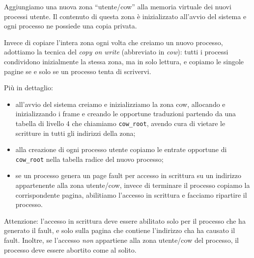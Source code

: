 Aggiungiamo una nuova zona ``utente/cow'' alla memoria virtuale dei nuovi processi utente.
Il contenuto di questa zona \`e inizializzato all'avvio del sistema e ogni processo ne possiede
una copia privata.

Invece di copiare l'intera zona ogni volta che creiamo un nuovo processo, adottiamo la tecnica
del {\em copy on write} (abbreviato in {\em cow}): tutti i processi condividono inizialmente
la stessa zona, ma in solo lettura, e copiamo le singole pagine se e solo se un processo tenta
di scrivervi.

Pi\`u in dettaglio:
\begin{itemize}
  \item all'avvio del sistema creiamo e inizializziamo
la zona cow, allocando e inizializzando i frame e creando le opportune
traduzioni partendo da una tabella di livello 4 che chiamiamo
{\tt cow\_root}, avendo cura di vietare le scritture in tutti gli
indirizzi della zona;
  \item alla creazione di ogni processo utente copiamo le entrate opportune
    di {\tt cow\_root} nella tabella radice del nuovo processo;
  \item se un processo genera un page fault per accesso in scrittura
    su un indirizzo appartenente alla zona utente/cow, invece di terminare
    il processo copiamo la corrispondente pagina, abilitiamo l'accesso
    in scrittura e facciamo ripartire il processo.
\end{itemize}
Attenzione: l'accesso in scrittura deve essere abilitato solo per il processo
che ha generato il fault, e solo sulla pagina che contiene l'indirizzo cha ha
causato il fault. Inoltre, se l'accesso {\em non} appartiene alla zona utente/cow del
processo, il processo deve essere abortito come al solito.

